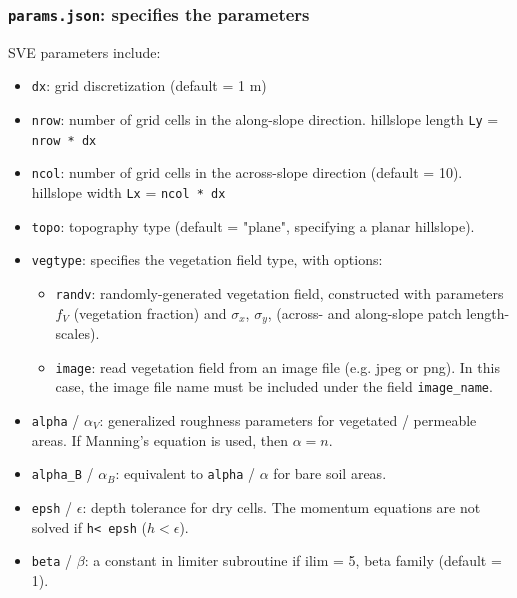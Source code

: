 \documentclass{article}
\newcommand{\code}[1]{\texttt{#1}}
\begin{document}
\subsubsection{\code{params.json}: specifies the parameters}
SVE parameters include:
\begin{itemize}
	\item \code{dx}: grid discretization (default = 1 m)  
	\item \code{nrow}:  number of grid cells in the along-slope direction.
		\subitem hillslope length \code{Ly} = \code{nrow * dx} 
	\item \code{ncol}:  number of grid cells in the across-slope direction (default = 10).
	 	\subitem hillslope width \code{Lx} = \code{ncol * dx} 
	\item \code{topo}: topography type (default = "plane", specifying a planar hillslope). 

	\item \code{vegtype}: specifies the vegetation field type, with options:
		\begin{itemize}
		\item \code{randv}: randomly-generated vegetation field, constructed with parameters $f_V$ (vegetation fraction) and $\sigma_x$, $\sigma_y$, (across- and along-slope patch length-scales).
	    \item \code{image}: read vegetation field from an image file (e.g. jpeg or png). In this case, the image file name must be included under the field \code{image\_name}.
		\end{itemize}
	\item \code{alpha} / $\alpha_V$: generalized roughness parameters for vegetated / permeable areas. If Manning's equation is used, then  $\alpha = n$.
	\item \code{alpha\_B} / $\alpha_B$: equivalent to \code{alpha} / $\alpha$   for bare soil areas.
	\item \code{epsh} / $\epsilon$: depth tolerance for dry cells.  The momentum equations are not solved if \code{h< epsh} ($h<\epsilon$).
	\item \code{beta} / $\beta$: a constant in limiter subroutine if ilim = 5, beta family (default = 1).   
\end{itemize}
\end{document}
